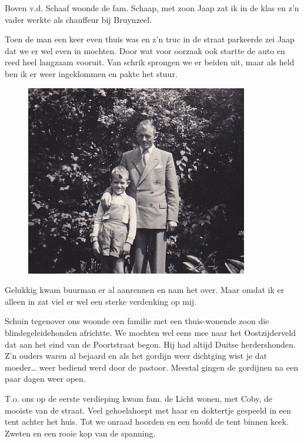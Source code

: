 \documentclass[12pt,twoside, openright]{memoir}
\begin{document}
Boven v.d. Schaaf woonde de fam. Schaap, met zoon Jaap zat ik in de klas en z’n vader werkte als chauffeur bij Bruynzeel. 

Toen de man een keer even thuis was en z'n truc in de straat parkeerde zei Jaap dat we er wel even in mochten. Door wat voor oorzaak ook startte de auto en reed heel langzaam vooruit. Van schrik sprongen we er beiden uit, maar als held ben ik er weer ingeklommen en pakte het stuur. 

\begin{figure}
\includegraphics[width=\textwidth]{img/ch5/indetuin}
\caption*{\footnotesize }
\end{figure}

Gelukkig kwam buurman er al aanrennen en nam het over. Maar omdat ik er alleen in zat viel er wel een sterke verdenking op mij. 

Schuin tegenover ons woonde een familie met een thuis-wonende zoon die blindegeleidehonden africhtte. We mochten wel eens mee naar het Oostzijderveld dat aan het eind van de Poortstraat begon. Hij had altijd Duitse herdershonden. Z'n ouders waren al bejaard en als het gordijn weer dichtging wist je dat moeder… weer bediend werd door de pastoor. Meestal gingen de gordijnen na een paar dagen weer open. 

T.o. ons op de eerste verdieping kwam fam. de Licht wonen, met Coby, de mooiste van de straat. Veel gehoelahoept met haar en doktertje gespeeld in een tent achter het huis. Tot we onraad hoorden en een hoofd de tent binnen keek. Zweten en een rooie kop van de spanning. 
\end{document}
